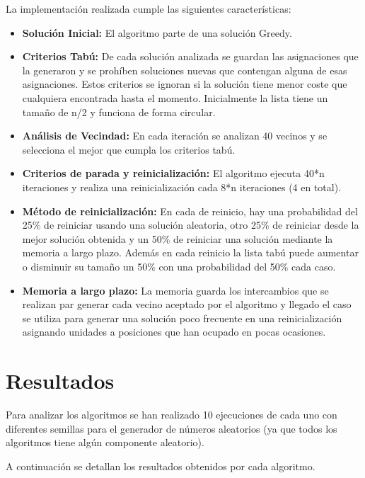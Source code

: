 \documentclass[runningheads,a4paper]{llncs}
\begin{document}
La implementación realizada cumple las siguientes características: 

\begin{itemize}
\item \textbf{Solución Inicial: } El algoritmo parte de una solución Greedy.
\item \textbf{Criterios Tabú: } De cada solución analizada se guardan las asignaciones que la generaron y se prohíben soluciones nuevas que contengan alguna de esas asignaciones. Estos criterios se ignoran si la solución tiene menor coste que cualquiera encontrada hasta el momento. Inicialmente la lista tiene un tamaño de n/2 y funciona de forma circular.
\item \textbf{Análisis de Vecindad: } En cada iteración se analizan 40 vecinos y se selecciona el mejor que cumpla los criterios tabú.
\item \textbf{Criterios de parada y reinicialización: } El algoritmo ejecuta 40*n iteraciones y realiza una reinicialización cada 8*n iteraciones (4 en total).
\item \textbf{Método de reinicialización: } En cada de reinicio, hay una probabilidad del 25\% de reiniciar usando una solución aleatoria, otro 25\% de reiniciar desde la mejor solución obtenida y un 50\% de reiniciar una solución mediante la memoria a largo plazo. Además en cada reinicio la lista tabú puede aumentar o disminuir su tamaño un 50\% con una probabilidad del 50\% cada caso.
\item \textbf{Memoria a largo plazo: } La memoria guarda los intercambios que se realizan par generar cada vecino aceptado por el algoritmo y llegado el caso se utiliza para generar una solución poco frecuente en una reinicialización asignando unidades a posiciones que han ocupado en pocas ocasiones.

\end{itemize}

\newpage
\section{Resultados}

Para analizar los algoritmos se han realizado 10 ejecuciones de cada uno con diferentes semillas para el generador de números aleatorios (ya que todos los algoritmos tiene algún componente aleatorio). 

A continuación se detallan los resultados obtenidos por cada algoritmo.
\end{document}
